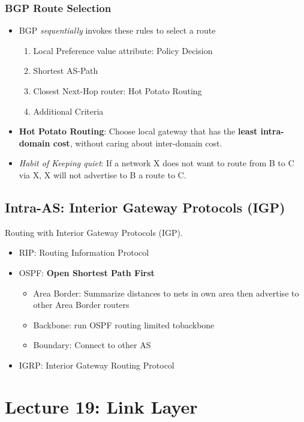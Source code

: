 \documentclass[a4paper]{article}
\begin{document}
\subsubsection{BGP Route Selection}
\begin{itemize}
    \item BGP \textit{sequentially} invokes these rules to select a route
    \begin{enumerate}
        \item  Local Preference value attribute: Policy Decision
        \item Shortest AS-Path
        \item Closest Next-Hop router: Hot Potato Routing
        \item Additional Criteria
    \end{enumerate}
    \item \textbf{Hot Potato Routing}: Choose local gateway that has the \textbf{least intra-domain cost}, without caring about inter-domain cost.
    \item \textit{Habit of Keeping quiet}: If a network X does not want to route from B to C via X, X will not advertise to B a route to C.
\end{itemize}

\subsection{Intra-AS: Interior Gateway Protocols (IGP)}
Routing with Interior Gateway Protocols (IGP).
\begin{itemize}
    \item RIP: Routing Information Protocol
    \item OSPF: \textbf{Open Shortest Path First}
    \begin{itemize}[label=$\circ$]
        \item Area Border: Summarize distances to nets in own area then advertise to other Area Border routers
        \item Backbone: run OSPF routing limited tobackbone
        \item Boundary: Connect to other AS
    \end{itemize}
    \item IGRP: Interior Gateway Routing Protocol
\end{itemize}

\newpage
\section{Lecture 19: Link Layer}
\end{document}
